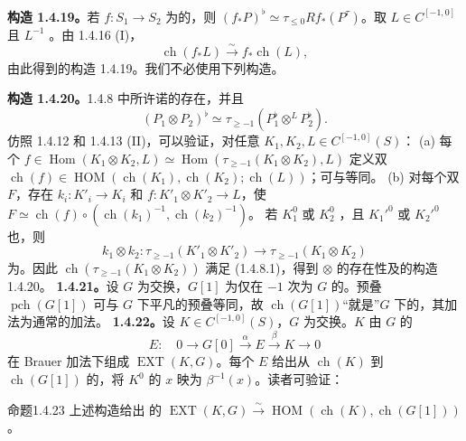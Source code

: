 \textbf{构造 1.4.19。}若 $f:S_1\to S_2$ 为的，则 $(f_*P)^\flat\simeq\tau_{\le0}Rf_*(P^\tau)$。取 $L\in C^{[-1,0]}$ 且 $L^{-1}$ 。由 1.4.16 (I)，
\[\operatorname{ch}(f_*L)\xrightarrow\sim f_*\operatorname{ch}(L),\tag{1.4.19.1}\]
由此得到的构造 1.4.19。我们不必使用下列构造。

\textbf{构造 1.4.20。}1.4.8 中所许诺的存在，并且
\[(P_1\otimes P_2)^\flat\simeq\tau_{\ge-1}(P_1^\flat\mathbin{\otimes^{L}}P_2^\flat).\]
仿照 1.4.12 和 1.4.13 (II)，可以验证，对任意 $K_1,K_2,L\in C^{[-1,0]}(S)$：
(a) 每个 $f\in\operatorname{Hom}(K_1\otimes K_2,L)\simeq\operatorname{Hom}(\tau_{\ge-1}(K_1\otimes K_2),L)$ 定义双 $\operatorname{ch}(f)\in\operatorname{HOM}(\operatorname{ch}(K_1),\operatorname{ch}(K_2);\operatorname{ch}(L))$；可与等同。
(b) 对每个双 $F$，存在 $k_i:K'_i\to K_i$ 和 $f:K'_1\otimes K'_2\to L$，使 $F\simeq\operatorname{ch}(f)\circ(\operatorname{ch}(k_1)^{-1},\operatorname{ch}(k_2)^{-1})$。
若 $K_1^0$ 或 $K_2^0$ ，且 $K_1'^0$ 或 $K_2'^0$ 也，则
\[k_1\otimes k_2:\tau_{\ge-1}(K'_1\otimes K'_2)\to\tau_{\ge-1}(K_1\otimes K_2)\]
为。因此 $\operatorname{ch}(\tau_{\ge-1}(K_1\otimes K_2))$ 满足 (1.4.8.1)，得到 $\otimes$ 的存在性及的构造 1.4.20。
\textbf{1.4.21。}设 $G$ 为交换，$G[1]$ 为仅在 $-1$ 次为 $G$ 的。预叠 $\operatorname{pch}(G[1])$ 可与 $G$ 下平凡的预叠等同，故 $\operatorname{ch}(G[1])$“就是”$G$ 下的，其加法为通常的加法。
\textbf{1.4.22。}设 $K\in C^{[-1,0]}(S)$，$G$ 为交换。$K$ 由 $G$ 的
\[E:\quad0\to G[0]\xrightarrow\alpha E\xrightarrow\beta K\to0\]
在 Brauer 加法下组成  $\operatorname{EXT}(K,G)$。每个 $E$ 给出从 $\operatorname{ch}(K)$ 到 $\operatorname{ch}(G[1])$ 的，将 $K^0$ 的 $x$ 映为 $\beta^{-1}(x)$。读者可验证：
\begin{SGAresult}{命题}{1.4.23}
上述构造给出 的
$\operatorname{EXT}(K,G)\xrightarrow\sim\operatorname{HOM}(\operatorname{ch}(K),\operatorname{ch}(G[1]))$。
\end{SGAresult}

